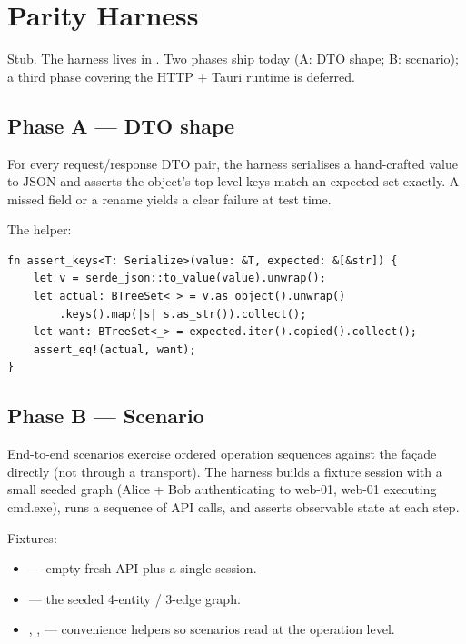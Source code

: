 \chapter{Parity Harness}
\label{ch:parity-harness}

\begin{note}
Stub. The harness lives in
. Two phases ship
today (A: DTO shape; B: scenario); a third phase covering the
HTTP + Tauri runtime is deferred.
\end{note}

\section{Phase A --- DTO shape}

For every request/response DTO pair, the harness serialises a
hand-crafted value to JSON and asserts the object's top-level keys
match an expected set exactly. A missed field or a rename yields a
clear failure at test time.

The helper:

\begin{lstlisting}[style=rust]
fn assert_keys<T: Serialize>(value: &T, expected: &[&str]) {
    let v = serde_json::to_value(value).unwrap();
    let actual: BTreeSet<_> = v.as_object().unwrap()
        .keys().map(|s| s.as_str()).collect();
    let want: BTreeSet<_> = expected.iter().copied().collect();
    assert_eq!(actual, want);
}
\end{lstlisting}

\section{Phase B --- Scenario}

End-to-end scenarios exercise ordered operation sequences against
the façade directly (not through a transport). The harness builds
a fixture session with a small seeded graph (Alice + Bob
authenticating to web-01, web-01 executing cmd.exe), runs a
sequence of API calls, and asserts observable state at each step.

Fixtures:
\begin{itemize}
    \item {} --- empty fresh API
        plus a single session.
    \item {} --- the seeded
        4-entity / 3-edge graph.
    \item {}, ,  --- convenience
        helpers so scenarios read at the operation level.
\end{itemize}

